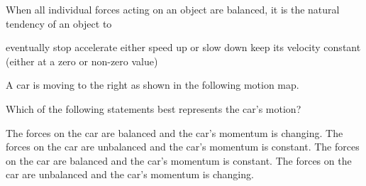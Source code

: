 \documentclass[answers]{exam}
\begin{document}
\begin{questions}


\question 
When all individual forces acting on an object are balanced, it is the natural tendency of an object to 

\begin{randomizechoices}[norandomize]
    \choice eventually stop
    \choice accelerate
    \choice either speed up or slow down
    \correctchoice keep its velocity constant (either at a zero or non-zero value)
\end{randomizechoices}

\question 
A car is moving to the right as shown in the following motion map. 

\begin{center}
\end{center}

Which of the following statements best represents the car’s motion?

\begin{randomizechoices}[norandomize]
    \choice The forces on the car are balanced and the car’s momentum is changing.			
    \choice The forces on the car are unbalanced and the car’s momentum is constant.
    \choice The forces on the car are balanced and the car’s momentum is constant.
    \correctchoice The forces on the car are unbalanced and the car’s momentum is changing.
\end{randomizechoices}


\end{questions}
\end{document}
